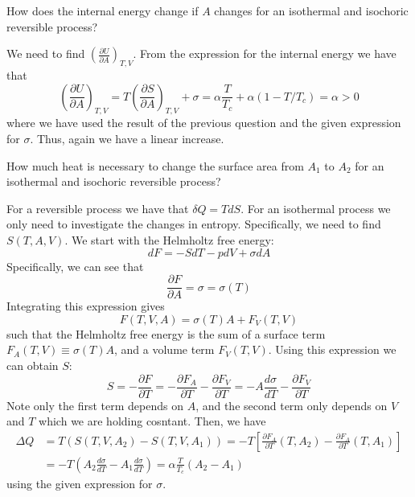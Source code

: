 \documentclass[12pt, a4paper, oneside, openright, titlepage]{book}
\begin{document}
\begin{qst}
    How does the internal energy change if $A$ changes for an isothermal and isochoric reversible process?
\end{qst}

We need to find $\left(\frac{\partial U}{\partial A}\right)_{T,V}$. From the expression for the internal energy we have that \begin{equation*}
    \left(\frac{\partial U}{\partial A}\right)_{T,V} = T\left(\frac{\partial S}{\partial A}\right)_{T,V} + \sigma = \alpha\frac{T}{T_c} + \alpha(1-T/T_c) = \alpha > 0 
\end{equation*}
where we have used the result of the previous question and the given expression for $\sigma$. Thus, again we have a linear increase.

\begin{qst}
    How much heat is necessary to change the surface area from $A_1$ to $A_2$ for an isothermal and isochoric reversible process?
\end{qst}
For a reversible process we have that $\delta Q = TdS$. For an isothermal process we only need to investigate the changes in entropy. Specifically, we need to find $S(T,A,V)$. We start with the Helmholtz free energy: \begin{equation*}
    dF = -SdT -pdV + \sigma dA
\end{equation*}
Specifically, we can see that \begin{equation*}
    \frac{\partial F}{\partial A} = \sigma = \sigma(T)
\end{equation*}
Integrating this expression gives \begin{equation*}
    F(T,V,A) = \sigma(T)A+F_V(T,V)
\end{equation*}
such that the Helmholtz free energy is the sum of a surface term $F_A(T,V) \equiv \sigma(T)A$, and a volume term $F_V(T,V)$. Using this expression we can obtain $S$: \begin{equation*}
    S = -\frac{\partial F}{\partial T} = -\frac{\partial F_A}{\partial T} - \frac{\partial F_V}{\partial T} = -A\frac{d\sigma}{dT} - \frac{\partial F_V}{\partial T}
\end{equation*}
Note only the first term depends on $A$, and the second term only depends on $V$ and $T$ which we are holding cosntant. Then, we have \begin{align*}
    \Delta Q &= T(S(T,V,A_2) - S(T,V,A_1)) = -T\left[\frac{\partial F_A}{\partial T}(T,A_2) - \frac{\partial F_A}{\partial T}(T,A_1)\right] \\
    &= -T\left(A_2\frac{d\sigma}{dT} - A_1\frac{d\sigma}{dT}\right) = \alpha\frac{T}{T_c}\left(A_2 - A_1\right)
\end{align*}
using the given expression for $\sigma$.
\end{document}
